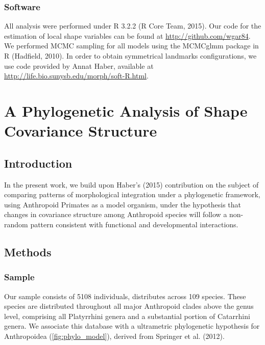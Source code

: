 \documentclass[12pt,twoside]{report}
\begin{document}
\subsection{Software}\label{software-1}

All analysis were performed under R 3.2.2 (R Core Team, 2015). Our code
for the estimation of local shape variables can be found at
\url{http://github.com/wgar84}. We performed MCMC sampling for all
models using the MCMCglmm package in R (Hadfield, 2010). In order to
obtain symmetrical landmarks configurations, we use code provided by
Annat Haber, available at
\url{http://life.bio.sunysb.edu/morph/soft-R.html}.

\newpage
\chapter{A Phylogenetic Analysis of Shape Covariance Structure}
\label{ch:ppca}

\section{Introduction}\label{introduction-2}

In the present work, we build upon Haber's (2015) contribution on the
subject of comparing patterns of morphological integration under a
phylogenetic framework, using Anthropoid Primates as a model organism,
under the hypothesis that changes in covariance structure among
Anthropoid species will follow a non-random pattern consistent with
functional and developmental interactions.

\section{Methods}\label{methods-2}

\subsection{Sample}\label{sample-2}

Our sample consists of 5108 individuals, distributes across 109 species.
These species are distributed throughout all major Anthropoid clades
above the genus level, comprising all Platyrrhini genera and a
substantial portion of Catarrhini genera. We associate this database
with a ultrametric phylogenetic hypothesis for Anthropoidea
(\autoref{fig:phylo_model}), derived from Springer et al. (2012).
\end{document}
